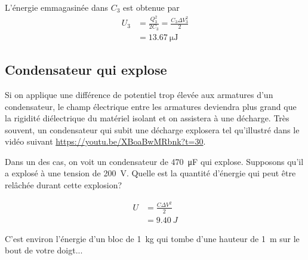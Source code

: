 L'énergie emmagasinée dans $C_3$ est obtenue par
\begin{align*}
  U_3 &= \frac{Q_3^2}{2C_3} = \frac{C_3 \Delta V_3^2}{2}  \\
      &= \SI{13.67}{\micro\joule}
\end{align*}



\subsection*{Condensateur qui explose}

Si on applique une différence de potentiel trop élevée aux armatures d'un
condensateur, le champ électrique entre les armatures deviendra plus grand que
la rigidité diélectrique du matériel isolant et on assistera à une décharge.
Très souvent, un condensateur qui subit une décharge explosera tel qu'illustré
dans le vidéo suivant \url{https://youtu.be/XBoaBwMRbnk?t=30}.


Dans un des cas, on voit un condensateur de \SI{470}{\micro\farad} qui explose.
Supposons qu'il a explosé à une tension de \SI{200}{\volt}. Quelle est la
quantité d'énergie qui peut être relâchée durant cette explosion?

\begin{align*}
  U &= \frac{C\Delta V^2}{2}  \\
    &= \SI{9.40}{J}
\end{align*}

C'est environ l'énergie d'un bloc de \SI{1}{kg} qui tombe d'une hauteur de
\SI{1}{m} sur le bout de votre doigt...



